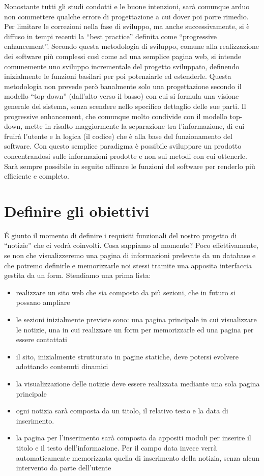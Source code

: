 Nonostante tutti gli studi condotti e le buone intenzioni, sarà comunque arduo non commettere qualche errore di progettazione a cui dover poi porre rimedio. Per limitare le correzioni nella fase di sviluppo, ma anche successivamente, si è diffuso in tempi recenti la ``best practice'' definita come ``progressive enhancement''. Secondo questa metodologia di sviluppo, comune alla realizzazione dei software più complessi così come ad una semplice pagina web, si intende comunemente uno sviluppo incrementale del progetto sviluppato, definendo inizialmente le funzioni basilari per poi potenziarle ed estenderle. Questa metodologia non prevede però banalmente solo una progettazione secondo il modello ``top-down'' (dall'alto verso il basso) con cui si formula una visione generale del sistema, senza scendere nello specifico dettaglio delle sue parti. Il progressive enhancement, che comunque molto condivide con il modello top-down, mette in risalto maggiormente la separazione tra l'informazione, di cui fruirà l'utente e la logica (il codice) che è alla base del funzionamento del software. Con questo semplice paradigma è possibile sviluppare un prodotto concentrandosi sulle informazioni prodotte e non sui metodi con cui ottenerle. Sarà sempre possibile in seguito affinare le funzioni del software per renderlo più efficiente e completo.

\section*{Definire gli obiettivi}
\'E giunto il momento di definire i requisiti funzionali del nostro progetto di ``notizie'' che ci vedrà coinvolti. Cosa sappiamo al momento? Poco effettivamente, se non che visualizzeremo una pagina di informazioni prelevate da un database e che potremo definirle e memorizzarle noi stessi tramite una apposita interfaccia gestita da un form. Stendiamo una prima lista:

\label{sec:notizia}
\begin{itemize}
\item realizzare un sito web che sia composto da più sezioni, che in futuro si possano ampliare
\item le sezioni inizialmente previste sono: una pagina principale in cui visualizzare le notizie, una in cui realizzare un form per memorizzarle ed una pagina per essere contattati
\item il sito, inizialmente strutturato in pagine statiche, deve potersi evolvere adottando contenuti dinamici
\item la visualizzazione delle notizie deve essere realizzata mediante una sola pagina principale
\item ogni notizia sarà composta da un titolo, il relativo testo e la data di inserimento.
\item la pagina per l'inserimento sarà composta da appositi moduli per inserire il titolo e il testo dell'informazione. Per il campo data invece verrà automaticamente memorizzata quella di inserimento della notizia, senza alcun intervento da parte dell'utente
\end{itemize}

